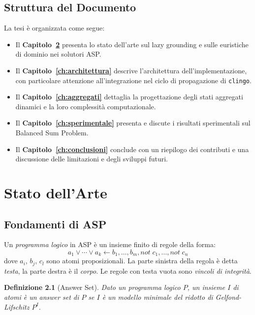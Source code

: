 \documentclass[a4paper,12pt,twoside,openright]{report}
\newtheorem{definition}{Definizione}[chapter]
\newcommand{\clingo}{\texttt{clingo}}
\begin{document}
\section{Struttura del Documento}

La tesi \`{e} organizzata come segue:
\begin{itemize}
    \item Il \textbf{Capitolo~\ref{ch:stato_arte}} presenta lo stato dell'arte sul lazy grounding e sulle euristiche di dominio nei solutori ASP.
    \item Il \textbf{Capitolo~\ref{ch:architettura}} descrive l'architettura dell'implementazione, con particolare attenzione all'integrazione nel ciclo di propagazione di \clingo{}.
    \item Il \textbf{Capitolo~\ref{ch:aggregati}} dettaglia la progettazione degli stati aggregati dinamici e la loro complessit\`{a} computazionale.
    \item Il \textbf{Capitolo~\ref{ch:sperimentale}} presenta e discute i risultati sperimentali sul Balanced Sum Problem.
    \item Il \textbf{Capitolo~\ref{ch:conclusioni}} conclude con un riepilogo dei contributi e una discussione delle limitazioni e degli sviluppi futuri.
\end{itemize}

\chapter{Stato dell'Arte}
\label{ch:stato_arte}

\section{Fondamenti di ASP}

Un \emph{programma logico} in ASP \`{e} un insieme finito di regole della forma:
\begin{equation}
    a_1 \vee \cdots \vee a_k \leftarrow b_1, \ldots, b_m, \mathit{not}\; c_1, \ldots, \mathit{not}\; c_n
\end{equation}
dove $a_i$, $b_j$, $c_l$ sono atomi proposizionali. La parte sinistra della regola \`{e} detta \emph{testa}, la parte destra \`{e} il \emph{corpo}. Le regole con testa vuota sono \emph{vincoli di integrit\`{a}}.

\begin{definition}[Answer Set]
Dato un programma logico $P$, un insieme $I$ di atomi \`{e} un \emph{answer set} di $P$ se $I$ \`{e} un modello minimale del \emph{ridotto di Gelfond-Lifschitz} $P^I$.
\end{definition}
\end{document}
